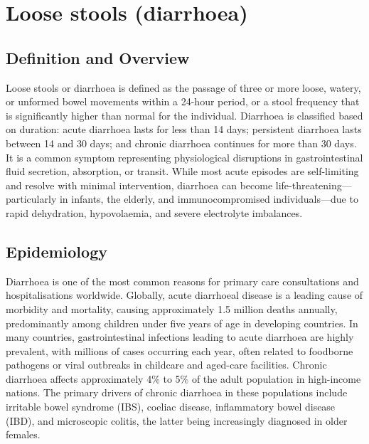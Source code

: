 \chapter{Loose stools (diarrhoea)}

\section*{Definition and Overview}
Loose stools or diarrhoea is defined as the passage of three or more loose, watery, or unformed bowel movements within a 24-hour period, or a stool frequency that is significantly higher than normal for the individual. Diarrhoea is classified based on duration: acute diarrhoea lasts for less than 14 days; persistent diarrhoea lasts between 14 and 30 days; and chronic diarrhoea continues for more than 30 days. It is a common symptom representing physiological disruptions in gastrointestinal fluid secretion, absorption, or transit. While most acute episodes are self-limiting and resolve with minimal intervention, diarrhoea can become life-threatening—particularly in infants, the elderly, and immunocompromised individuals—due to rapid dehydration, hypovolaemia, and severe electrolyte imbalances.

\section*{Epidemiology}
Diarrhoea is one of the most common reasons for primary care consultations and hospitalisations worldwide. Globally, acute diarrhoeal disease is a leading cause of morbidity and mortality, causing approximately 1.5 million deaths annually, predominantly among children under five years of age in developing countries. In many countries, gastrointestinal infections leading to acute diarrhoea are highly prevalent, with millions of cases occurring each year, often related to foodborne pathogens or viral outbreaks in childcare and aged-care facilities. Chronic diarrhoea affects approximately 4\% to 5\% of the adult population in high-income nations. The primary drivers of chronic diarrhoea in these populations include irritable bowel syndrome (IBS), coeliac disease, inflammatory bowel disease (IBD), and microscopic colitis, the latter being increasingly diagnosed in older females.


